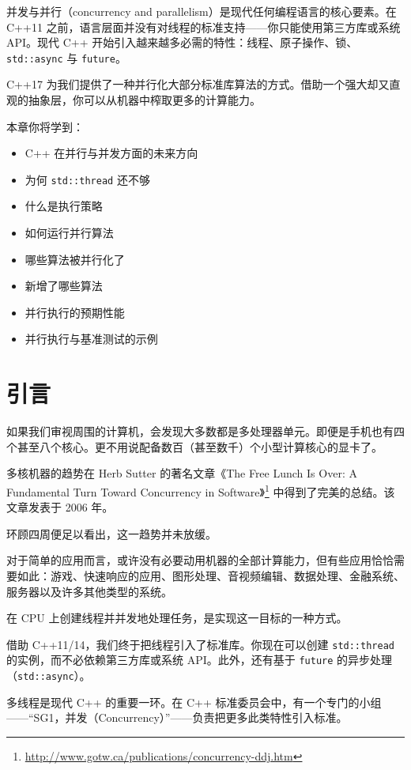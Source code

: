 并发与并行（concurrency and parallelism）是现代任何编程语言的核心要素。在 C++11 之前，语言层面并没有对线程的标准支持——你只能使用第三方库或系统 API。现代 C++ 开始引入越来越多必需的特性：线程、原子操作、锁、\texttt{std::async} 与 \texttt{future}。

C++17 为我们提供了一种并行化大部分标准库算法的方式。借助一个强大却又直观的抽象层，你可以从机器中榨取更多的计算能力。

本章你将学到：
\begin{itemize}
\item C++ 在并行与并发方面的未来方向
\item 为何 \texttt{std::thread} 还不够
\item 什么是执行策略
\item 如何运行并行算法
\item 哪些算法被并行化了
\item 新增了哪些算法
\item 并行执行的预期性能
\item 并行执行与基准测试的示例
\end{itemize}


\section{引言}

如果我们审视周围的计算机，会发现大多数都是多处理器单元。即便是手机也有四个甚至八个核心。更不用说配备数百（甚至数千）个小型计算核心的显卡了。

多核机器的趋势在 Herb Sutter 的著名文章《The Free Lunch Is Over: A Fundamental Turn Toward Concurrency in Software》\footnote{\url{http://www.gotw.ca/publications/concurrency-ddj.htm}} 中得到了完美的总结。该文章发表于 2006 年。

环顾四周便足以看出，这一趋势并未放缓。

对于简单的应用而言，或许没有必要动用机器的全部计算能力，但有些应用恰恰需要如此：游戏、快速响应的应用、图形处理、音视频编辑、数据处理、金融系统、服务器以及许多其他类型的系统。

在 CPU 上创建线程并并发地处理任务，是实现这一目标的一种方式。

借助 C++11/14，我们终于把线程引入了标准库。你现在可以创建 \texttt{std::thread} 的实例，而不必依赖第三方库或系统 API。此外，还有基于 \texttt{future} 的异步处理（\texttt{std::async}）。

多线程是现代 C++ 的重要一环。在 C++ 标准委员会中，有一个专门的小组——“SG1，并发（Concurrency）”——负责把更多此类特性引入标准。


